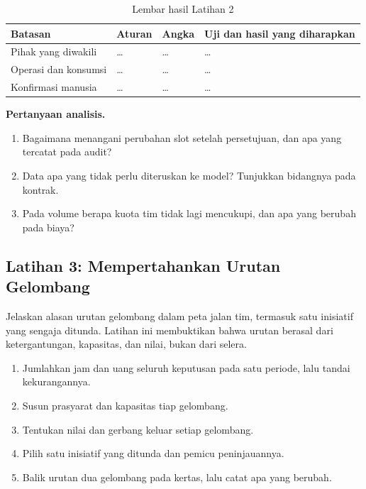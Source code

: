 \begin{table}[!htb]
  \centering
  \caption{Lembar hasil Latihan 2}
  \label{tab:ch14-lat2-hasil}
  \footnotesize
  \begin{tabularx}{\textwidth}{H{1.9cm}GGG}
    \hline
    \textbf{Batasan} & \textbf{Aturan} & \textbf{Angka} & \textbf{Uji dan hasil yang diharapkan} \\ \hline
    Pihak yang diwakili & \dots & \dots & \dots \\ \hline
    Operasi dan konsumsi & \dots & \dots & \dots \\ \hline
    Konfirmasi manusia & \dots & \dots & \dots \\ \hline
  \end{tabularx}
\end{table}

\textbf{Pertanyaan analisis.}
\begin{enumerate}
  \item Bagaimana menangani perubahan slot setelah persetujuan, dan apa yang tercatat pada audit?
  \item Data apa yang tidak perlu diteruskan ke model? Tunjukkan bidangnya pada kontrak.
  \item Pada volume berapa kuota tim tidak lagi mencukupi, dan apa yang berubah pada biaya?
\end{enumerate}

\subsection*{Latihan 3: Mempertahankan Urutan Gelombang}

Jelaskan alasan urutan gelombang dalam peta jalan tim, termasuk satu inisiatif yang sengaja ditunda. Latihan ini membuktikan bahwa urutan berasal dari ketergantungan, kapasitas, dan nilai, bukan dari selera.

\begin{enumerate}
  \item Jumlahkan jam dan uang seluruh keputusan pada satu periode, lalu tandai kekurangannya.
  \item Susun prasyarat dan kapasitas tiap gelombang.
  \item Tentukan nilai dan gerbang keluar setiap gelombang.
  \item Pilih satu inisiatif yang ditunda dan pemicu peninjauannya.
  \item Balik urutan dua gelombang pada kertas, lalu catat apa yang berubah.
\end{enumerate}

